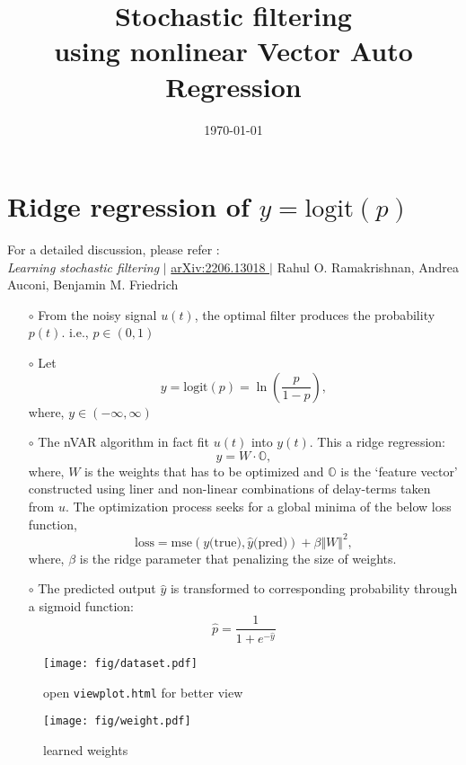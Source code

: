 \documentclass{article}
\title{\huge Stochastic filtering\\ \large using nonlinear Vector Auto Regression}
\date{\today}
\begin{document}
\maketitle
\vspace*{-1.cm}
\section*{Ridge regression of $y = \text{logit}(p)$}
For a detailed discussion, please refer :\\
\emph{Learning stochastic filtering} \(|\)
\href{https://arxiv.org/abs/2206.13018}{arXiv:2206.13018 } \(|\)
{{Rahul O. Ramakrishnan}}, {Andrea Auconi}, {Benjamin M. Friedrich}\\


\begin{itemize}
\item[$\circ$] From the noisy signal $u(t)$, the optimal filter produces the probability $p(t)$. i.e., $p \in (0,1)$
\item[$\circ$] Let 
\begin{equation}
y = \text{logit} (p) = \ln\left(\frac{p}{1-p} \right),
\end{equation}
where, $y \in (-\infty, \infty)$
\item[$\circ$] The nVAR algorithm in fact fit $u(t)$ into $y(t)$. This a ridge regression:
\begin{equation}
y = W \cdot \mathbb{O},
\end{equation}
where, $W$ is the weights that has to be optimized and $\mathbb{O}$ is the `feature vector' constructed using liner and non-linear combinations of delay-terms taken from $u$. The optimization process seeks for a global minima of the below loss function,
\begin{equation}
\text{loss} = \text{mse}(y \text{(true)}, \widehat{y}\text{(pred)}) + \beta \Vert W \Vert^2,
\end{equation}
where, $\beta$ is the ridge parameter that penalizing the size of weights.

\item[$\circ$] The predicted output $\widehat{y}$ is transformed to corresponding probability through a sigmoid function:
\begin{equation}
\widehat{p} = \frac{1}{1+ e^{-\widehat{y}}}
\end{equation}
\end{itemize}


\begin{figure}[H]
    \centering
	\texttt{[image: fig/dataset.pdf]}
	\caption{open \texttt{view\textunderscore plot.html} for better view}
\end{figure}

\begin{figure}[H]
    \centering
	\texttt{[image: fig/weight.pdf]}
	\caption{learned weights}
\end{figure}
\pagebreak
\end{document}
